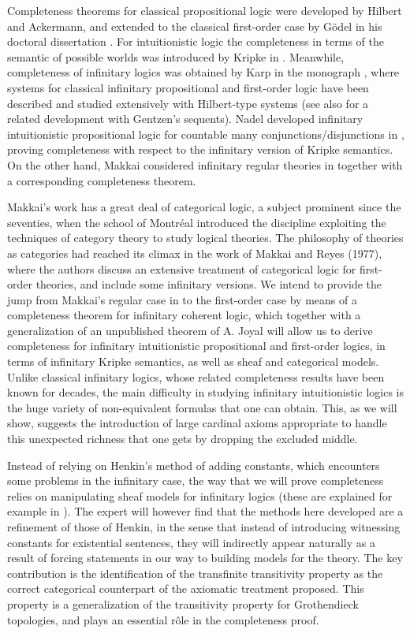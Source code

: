 \documentclass[a4paper,11pt]{article}
\theoremstyle{plain}
\theoremstyle{plain}
\theoremstyle{remark}
\begin{document}
Completeness theorems for classical propositional logic were developed by Hilbert and Ackermann, and extended to the classical first-order case by G\"odel in his doctoral dissertation \cite{godel}. For intuitionistic logic the completeness in terms of the semantic of possible worlds was introduced by Kripke in \cite{kripke}. Meanwhile, completeness of infinitary logics was obtained by Karp in the monograph \cite{karp}, where systems for classical infinitary propositional and first-order logic have been described and studied extensively with Hilbert-type systems (see also \cite{mt} for a related development with Gentzen's sequents). Nadel developed infinitary intuitionistic propositional logic for countable many conjunctions/disjunctions in \cite{nadel}, proving completeness with respect to the infinitary version of Kripke semantics. On the other hand, Makkai considered infinitary regular theories in \cite{makkai} together with a corresponding completeness theorem. 

Makkai's work has a great deal of categorical logic, a subject prominent since the seventies, when the school of Montr\'eal introduced the discipline exploiting the techniques of category theory to study logical theories. The philosophy of theories as categories had reached its climax in the work of Makkai and Reyes \cite{mr} (1977), where the authors discuss an extensive treatment of categorical logic for first-order theories, and include some infinitary versions. We intend to provide the jump from Makkai's regular case in \cite{makkai} to the first-order case by means of a completeness theorem for infinitary coherent logic, which together with a generalization of an unpublished theorem of A. Joyal will allow us to derive completeness for infinitary intuitionistic propositional and first-order logics, in terms of infinitary Kripke semantics, as well as sheaf and categorical models. Unlike classical infinitary logics, whose related completeness results have been known for decades, the main difficulty in studying infinitary intuitionistic logics is the huge variety of non-equivalent formulas that one can obtain. This, as we will show, suggests the introduction of large cardinal axioms appropriate to handle this unexpected richness that one gets by dropping the excluded middle.

Instead of relying on Henkin's method of adding constants, which encounters some problems in the infinitary case, the way that we will prove completeness relies on manipulating sheaf models for infinitary logics (these are explained for example in \cite{bj}). The expert will however find that the methods here developed are a refinement of those of Henkin, in the sense that instead of introducing witnessing constants for existential sentences, they will indirectly appear naturally as a result of forcing statements in our way to building models for the theory. The key contribution is the identification of the transfinite transitivity property as the correct categorical counterpart of the axiomatic treatment proposed. This property is a generalization of the transitivity property for Grothendieck topologies, and plays an essential r\^ole in the completeness proof.
\end{document}
